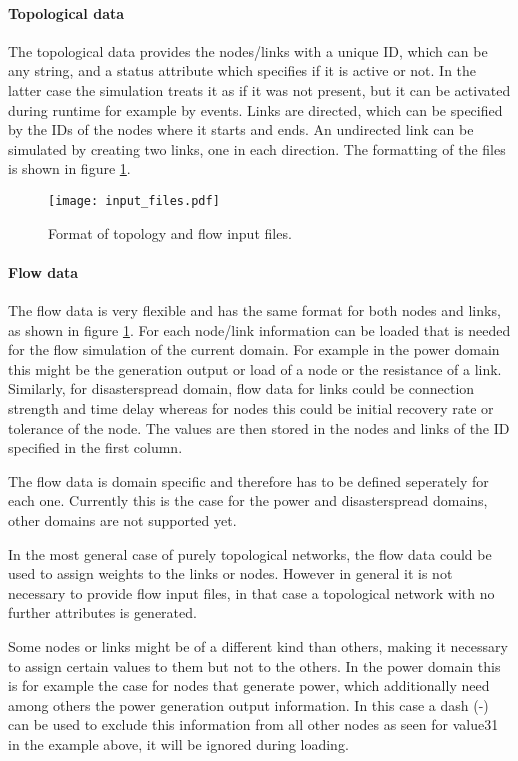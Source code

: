 \documentclass[11pt,fleqn]{book} %
\newcommand{\domain}[1][]{domain#1}
\begin{document}
\paragraph{Topological data} The topological data provides the nodes/links with a unique ID, which can be any string, and a status attribute which specifies if it is active or not. In the latter case the simulation treats it as if it was not present, but it can be activated during runtime for example by events. Links are directed, which can be specified by the IDs of the nodes where it starts and ends. An undirected link can be simulated by creating two links, one in each direction. The formatting of the files is shown in figure \ref{fig:input_files}.

\begin{figure}[!h]
\centering\texttt{[image: input\_files.pdf]}
\caption{Format of topology and flow input files.}
\label{fig:input_files}
\end{figure}

\paragraph{Flow data} The flow data is very flexible and has the same format for both nodes and links, as shown in figure \ref{fig:input_files}. For each node/link information can be loaded that is needed for the flow simulation of the current \domain{}. For example in the power \domain{} this might be the generation output or load of a node or the resistance of a link. Similarly, for disaster\textunderscore spread \domain{}, flow data for links could be connection strength and time delay whereas for nodes this could be initial recovery rate or tolerance of the node. The values are then stored in the nodes and links of the ID specified in the first column.

The flow data is \domain{} specific and therefore has to be defined seperately for each one. Currently this is the case for the power and disaster\textunderscore spread \domain{s}, other \domain{s} are not supported yet.

In the most general case of purely topological networks, the flow data could be used to assign weights to the links or nodes. However in general it is not necessary to provide flow input files, in that case a topological network with no further attributes is generated.

Some nodes or links might be of a different kind than others, making it necessary to assign certain values to them but not to the others. In the power \domain{} this is for example the case for nodes that generate power, which additionally need among others the power generation output information. In this case a dash (-) can be used to exclude this information from all other nodes as seen for value31 in the example above, it will be ignored during loading. 
\end{document}
